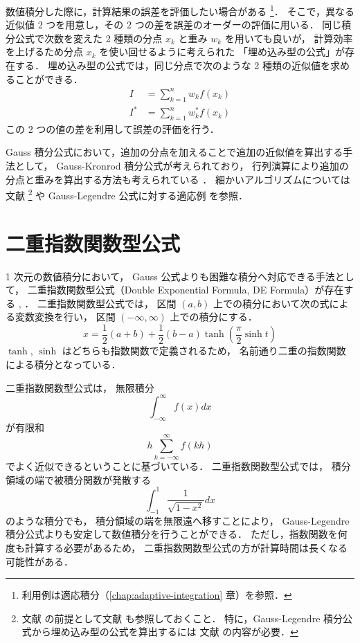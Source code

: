 数値積分した際に，計算結果の誤差を評価したい場合がある
\footnote{利用例は適応積分（\ref{chap:adaptive-integration} 章）を参照．}．
そこで，異なる近似値 2 つを用意し，その 2 つの差を誤差のオーダーの評価に用いる．
同じ積分公式で次数を変えた 2 種類の分点 $x_k$ と重み $w_k$ を用いても良いが，
計算効率を上げるため分点 $x_k$ を使い回せるように考えられた
「埋め込み型の公式」が存在する．
埋め込み型の公式では，同じ分点で次のような 2 種類の近似値を求めることができる．
\begin{align}
    I   & = \sum_{k = 1}^n w_k f(x_k)   \\
    I^* & = \sum_{k = 1}^n w_k^* f(x_k)
\end{align}
この 2 つの値の差を利用して誤差の評価を行う．

Gauss 積分公式において，追加の分点を加えることで追加の近似値を算出する手法として，
Gauss-Kronrod 積分公式が考えられており，
行列演算により追加の分点と重みを算出する方法も考えられている
\cite{Laurie1997}．
細かいアルゴリズムについては文献 \cite{Laurie1997}
\footnote{文献 \cite{Laurie1997} の前提として文献 \cite{Golub1969} も参照しておくこと．%
    特に，Gauss-Legendre 積分公式から埋め込み型の公式を算出するには%
    文献 \cite{Golub1969} の内容が必要．}
や
Gauss-Legendre 公式に対する適応例 \cite{NumericalCollectionCpp} を参照．

\section{二重指数関数型公式}

1 次元の数値積分において，
Gauss 公式よりも困難な積分へ対応できる手法として，
二重指数関数型公式（Double Exponential Formula, DE Formula）が存在する
\cite[6.1 節 (b)]{Mori1993}, \cite[Section 4.5]{Press2007}．
二重指数関数型公式では，
区間 $(a, b)$ 上での積分において次の式による変数変換を行い，
区間 $(-\infty, \infty)$ 上での積分にする．
\begin{equation}
    x = \frac{1}{2}(a + b) + \frac{1}{2}(b - a) \tanh \left(\frac{\pi}{2} \sinh{t}\right)
\end{equation}
$\tanh$, $\sinh$ はどちらも指数関数で定義されるため，
名前通り二重の指数関数による積分となっている．

二重指数関数型公式は，
無限積分
\begin{equation}
    \int_{-\infty}^{\infty} f(x) dx
\end{equation}
が有限和
\begin{equation}
    h \sum_{k = -\infty}^{\infty} f(kh)
\end{equation}
でよく近似できるということに基づいている\cite[6.1 節 (b)]{Mori1993}．
二重指数関数型公式では，
積分領域の端で被積分関数が発散する
\begin{equation}
    \int_{-1}^{1} \frac{1}{\sqrt{1-x^2}} dx
\end{equation}
のような積分でも，
積分領域の端を無限遠へ移すことにより，
Gauss-Legendre 積分公式よりも安定して数値積分を行うことができる．
ただし，指数関数を何度も計算する必要があるため，
二重指数関数型公式の方が計算時間は長くなる可能性がある．

